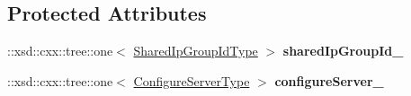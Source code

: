 \subsection*{Protected Attributes}
\begin{DoxyCompactItemize}
\item 
\hypertarget{classopenstack_1_1xml_1_1ShareIp_aae38d1c14a96323264c9abd329745de6}{
::xsd::cxx::tree::one$<$ \hyperlink{classopenstack_1_1xml_1_1ShareIp_a87dc25c5a0ba0a3cc1de61d027d9443d}{SharedIpGroupIdType} $>$ {\bfseries sharedIpGroupId\_\-}}
\label{classopenstack_1_1xml_1_1ShareIp_aae38d1c14a96323264c9abd329745de6}

\item 
\hypertarget{classopenstack_1_1xml_1_1ShareIp_a9fbe52fcb4e1fbef4167b26c56c8a4c5}{
::xsd::cxx::tree::one$<$ \hyperlink{classopenstack_1_1xml_1_1ShareIp_af9b6ca81de82217c6f2d6cc93182b81c}{ConfigureServerType} $>$ {\bfseries configureServer\_\-}}
\label{classopenstack_1_1xml_1_1ShareIp_a9fbe52fcb4e1fbef4167b26c56c8a4c5}

\end{DoxyCompactItemize}
